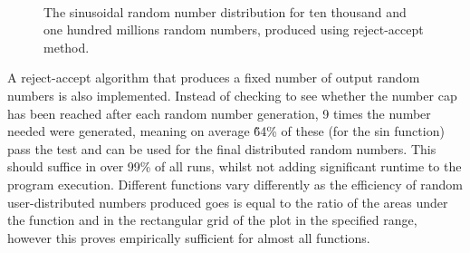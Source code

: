 \begin{figure}
    \centering
     \\
    \caption{The sinusoidal random number distribution for ten thousand and one hundred millions random numbers, produced using reject-accept method.}
    \label{fig:reject_accept_sin}
\end{figure}

A reject-accept algorithm that produces a fixed number of output random numbers is also implemented. Instead of checking to see whether the number cap has been reached after each random number generation, 9 times the number needed were generated, meaning on average \~64\% of these (for the sin function) pass the test and can be used for the final distributed random numbers. This should suffice in over 99\% of all runs, whilst not adding significant runtime to the program execution. Different functions vary differently as the efficiency of random user-distributed numbers produced goes is equal to the ratio of the areas under the function and in the rectangular grid of the plot in the specified range, however this proves empirically sufficient for almost all functions.
